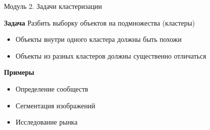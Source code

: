 \documentclass[10pt,a4paper]{beamer}
\begin{document}

\begin{frame}{Модуль 2. Задачи кластеризации}

{\bf Задача} Разбить выборку объектов на подмножества (кластеры)
\begin{itemize}
\item Объекты внутри одного кластера должны быть похожи
\item Объекты из разных кластеров должны существенно отличаться
\end{itemize}

{\bf Примеры}
\begin{itemize}
\item Определение сообществ
\item Сегментация изображений
\item Исследование рынка
\end{itemize}

\end{frame}

\end{document}
